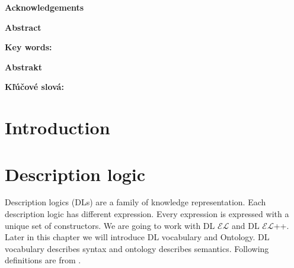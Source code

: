 \documentclass[12pt,a4paper]{article}
\newcommand{\textoverline}[1]{{\setul{-5em}{}$\overline{\mbox{#1}}$}}
\begin{document}
\pagebreak

\justify


\pagebreak
\thispagestyle{empty}
\par\vspace*{15cm}
{\large\bf Acknowledgements \newline \par}

\pagebreak
\thispagestyle{empty}
{\large\bf Abstract \newline \par} 

\textbf{Key words:}

\pagebreak
\thispagestyle{empty}
{\large\bf Abstrakt \newline \par} 

\textbf{Kľúčové slová:}

\pagebreak
\thispagestyle{empty}
\tableofcontents
\thispagestyle{empty}

\pagebreak
\thispagestyle{empty}
\listoffigures

\pagebreak
\section*{Introduction}


\pagebreak
\section{Description logic}
Description logics (DLs) are a family of knowledge representation. Each description logic has different expression. Every expression is expressed with a unique set of constructors. We are going to work with DL $\mathcal{EL}$ and DL $\mathcal{EL}${+}{+}. Later in this chapter we will introduce DL vocabulary and Ontology. DL vocabulary describes syntax and ontology describes semantics. Following definitions are from \citep{baaderHandbook}.
\end{document}
